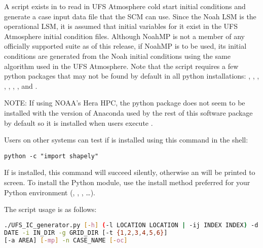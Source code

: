 A script exists in  to read in UFS Atmosphere cold start initial conditions and generate a case input data file that the SCM can use. Since the Noah LSM is the operational LSM, it is assumed that initial variables for it exist in the UFS Atmosphere initial condition files. Although NoahMP is not a member of any officially supported suite as of this release, if NoahMP is to be used, its initial conditions are generated from the Noah initial conditions using the same algorithm used in the UFS Atmosphere. Note that the script requires a few python packages that may not be found by default in all python installations: , , , , , , , and . 

NOTE: If using NOAA's Hera HPC, the  python package does not seem to be installed with the version of Anaconda used by the rest of this software package by default so it is installed when users execute . 

Users on other systems can test if  is installed using this command in the shell:
\begin{lstlisting}
python -c "import shapely"
\end{lstlisting}
If  is installed, this command will succeed silently, otherwise an  will be printed to screen. To install the  Python module, use the install method preferred for your Python environment (, , , \dots).

The  script usage is as follows:

\begin{lstlisting}[language=bash]
./UFS_IC_generator.py [-h] (-l LOCATION LOCATION | -ij INDEX INDEX) -d
DATE -i IN_DIR -g GRID_DIR [-t {1,2,3,4,5,6}]
[-a AREA] [-mp] -n CASE_NAME [-oc]
\end{lstlisting}

